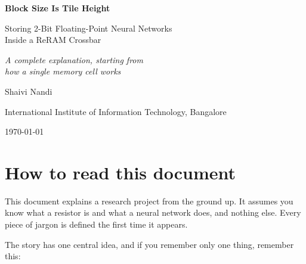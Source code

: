 \documentclass[11pt,a4paper]{report}
\begin{document}
\begin{titlepage}
\centering
\vspace*{2cm}
{\Huge\bfseries\color{acc} Block Size Is Tile Height\par}
\vspace{0.8cm}
{\LARGE Storing 2-Bit Floating-Point Neural Networks\\[4pt] Inside a ReRAM Crossbar\par}
\vspace{1.4cm}
{\Large\itshape A complete explanation, starting from\\ how a single memory cell works\par}
\vspace{2cm}


\vspace{2cm}
{\large Shaivi Nandi\par}
\vspace{0.3cm}
{\large International Institute of Information Technology, Bangalore\par}
\vspace{1.5cm}
{\large\today\par}
\end{titlepage}

\chapter*{How to read this document}

This document explains a research project from the ground up. It assumes you
know what a resistor is and what a neural network does, and nothing else.
Every piece of jargon is defined the first time it appears.

The story has one central idea, and if you remember only one thing, remember
this:
\end{document}
